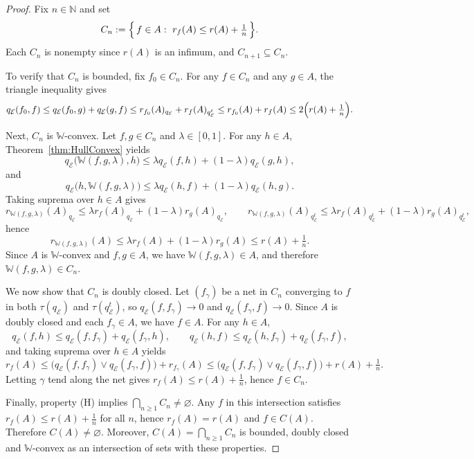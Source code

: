 \documentclass[preprint,12pt]{elsarticle}
\numberwithin{equation}{section}
\newcommand{\E}{\mathcal{E}}
\begin{document}
\begin{proof}
Fix $n\in\mathbb{N}$ and set
\[
C_n:=\Bigl\{\,f\in A:\ r_f(A)\le r(A)+\tfrac{1}{n}\,\Bigr\}.
\]
Each $C_n$ is nonempty since $r(A)$ is an infimum, and $C_{n+1}\subseteq C_n$.

To verify that $C_n$ is bounded, fix $f_0\in C_n$. For any $f\in C_n$ and any $g\in A$, the triangle inequality gives
\[
q_{\E}(f_0,f)\le q_{\E}(f_0,g)+q_{\E}(g,f)\le r_{f_0}(A)_{q_{\E}}+r_f(A)_{q_{\E}^{t}}
\le r_{f_0}(A)+r_f(A)\le 2\Bigl(r(A)+\tfrac1n\Bigr).
\]

Next, $C_n$ is $\mathbb{W}$-convex. Let $f,g\in C_n$ and $\lambda\in[0,1]$. For any $h\in A$,
Theorem~\ref{thm:HullConvex} yields
\[
q_{\E}\bigl(\mathbb{W}(f,g,\lambda),h\bigr)\le \lambda q_{\E}(f,h)+(1-\lambda)q_{\E}(g,h),
\]
and
\[
q_{\E}\bigl(h,\mathbb{W}(f,g,\lambda)\bigr)\le \lambda q_{\E}(h,f)+(1-\lambda)q_{\E}(h,g).
\]
Taking suprema over $h\in A$ gives
\[
r_{\mathbb{W}(f,g,\lambda)}(A)_{q_{\E}}
\le \lambda r_f(A)_{q_{\E}}+(1-\lambda)r_g(A)_{q_{\E}},
\qquad
r_{\mathbb{W}(f,g,\lambda)}(A)_{q_{\E}^{t}}
\le \lambda r_f(A)_{q_{\E}^{t}}+(1-\lambda)r_g(A)_{q_{\E}^{t}},
\]
hence
\[
r_{\mathbb{W}(f,g,\lambda)}(A)\le \lambda r_f(A)+(1-\lambda)r_g(A)\le r(A)+\tfrac1n.
\]
Since $A$ is $\mathbb{W}$-convex and $f,g\in A$, we have $\mathbb{W}(f,g,\lambda)\in A$, and therefore
$\mathbb{W}(f,g,\lambda)\in C_n$.

We now show that $C_n$ is doubly closed. Let $(f_\gamma)$ be a net in $C_n$ converging to $f$ in both
$\tau(q_{\E})$ and $\tau(q_{\E}^{t})$, so $q_{\E}(f,f_\gamma)\to 0$ and $q_{\E}(f_\gamma,f)\to 0$.
Since $A$ is doubly closed and each $f_\gamma\in A$, we have $f\in A$. For any $h\in A$,
\[
q_{\E}(f,h)\le q_{\E}(f,f_\gamma)+q_{\E}(f_\gamma,h),\qquad
q_{\E}(h,f)\le q_{\E}(h,f_\gamma)+q_{\E}(f_\gamma,f),
\]
and taking suprema over $h\in A$ yields
\[
r_f(A)\le \bigl(q_{\E}(f,f_\gamma)\vee q_{\E}(f_\gamma,f)\bigr)+r_{f_\gamma}(A)
\le \bigl(q_{\E}(f,f_\gamma)\vee q_{\E}(f_\gamma,f)\bigr)+r(A)+\tfrac1n.
\]
Letting $\gamma$ tend along the net gives $r_f(A)\le r(A)+\tfrac1n$, hence $f\in C_n$.

Finally, property {\rm(H)} implies $\bigcap_{n\ge 1}C_n\neq\varnothing$. Any $f$ in this intersection satisfies
$r_f(A)\le r(A)+\frac1n$ for all $n$, hence $r_f(A)=r(A)$ and $f\in C(A)$. Therefore $C(A)\neq\varnothing$.
Moreover, $C(A)=\bigcap_{n\ge 1}C_n$ is bounded, doubly closed and $\mathbb{W}$-convex as an intersection of
sets with these properties.
\end{proof}
\end{document}
